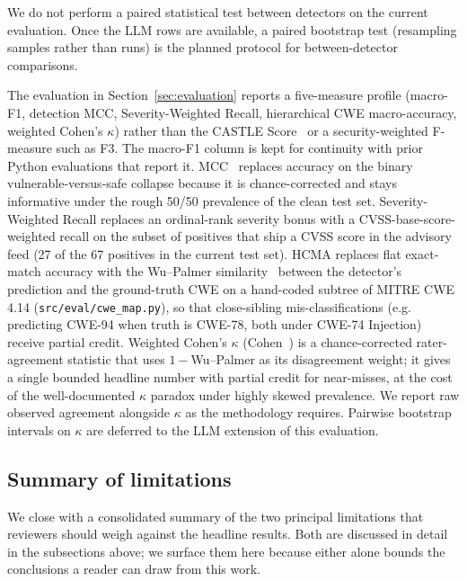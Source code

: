 We do not perform a paired statistical test between detectors on the
current evaluation. Once the LLM rows are available, a paired bootstrap
test (resampling samples rather than runs) is the planned protocol
for between-detector comparisons.

The evaluation in Section~\ref{sec:evaluation} reports a five-measure
profile (macro-F1, detection MCC, Severity-Weighted Recall,
hierarchical CWE macro-accuracy, weighted Cohen's $\kappa$) rather
than the CASTLE Score~\cite{castle} or a security-weighted F-measure
such as F3. The macro-F1 column is kept for continuity with prior
Python evaluations that report it. MCC~\cite{chicco2020mcc} replaces
accuracy on the binary vulnerable-versus-safe collapse because it is
chance-corrected and stays informative under the rough 50/50 prevalence
of the clean test set. Severity-Weighted Recall replaces an
ordinal-rank severity bonus with a CVSS-base-score-weighted recall on
the subset of positives that ship a CVSS score in the advisory feed
(27 of the 67 positives in the current test set). HCMA replaces
flat exact-match accuracy with the Wu--Palmer
similarity~\cite{wupalmer1994} between the detector's prediction and
the ground-truth CWE on a hand-coded subtree of MITRE CWE 4.14
(\texttt{src/eval/cwe\_map.py}), so that close-sibling
mis-classifications (e.g. predicting CWE-94 when truth is CWE-78,
both under CWE-74 Injection) receive partial credit. Weighted
Cohen's $\kappa$ (Cohen~\cite{cohen1968kappa}) is a chance-corrected
rater-agreement statistic that uses $1{-}$Wu--Palmer as its
disagreement weight; it gives a single bounded headline number with
partial credit for near-misses, at the cost of the well-documented
$\kappa$ paradox under highly skewed prevalence. We report raw
observed agreement alongside $\kappa$ as the methodology requires.
Pairwise bootstrap intervals on $\kappa$ are deferred to the LLM
extension of this evaluation.

\subsection{Summary of limitations}
\label{sec:threats:limitations}

We close with a consolidated summary of the two principal limitations
that reviewers should weigh against the headline results. Both are
discussed in detail in the subsections above; we surface them here
because either alone bounds the conclusions a reader can draw from
this work.

